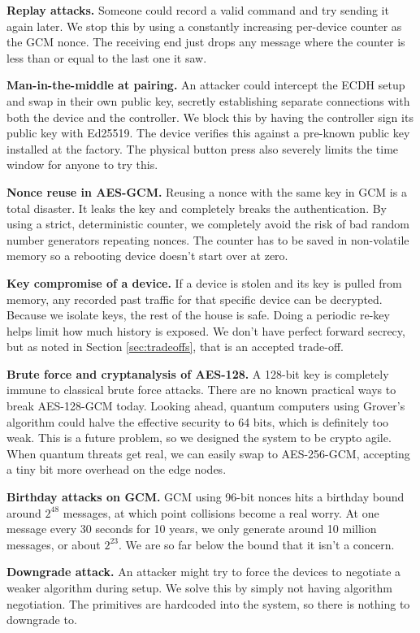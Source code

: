 \documentclass[a4paper,11pt]{article}
\begin{document}
\textbf{Replay attacks.} Someone could record a valid command and try sending it again later. We stop this by using a constantly increasing per-device counter as the GCM nonce. The receiving end just drops any message where the counter is less than or equal to the last one it saw.

\textbf{Man-in-the-middle at pairing.} An attacker could intercept the ECDH setup and swap in their own public key, secretly establishing separate connections with both the device and the controller. We block this by having the controller sign its public key with Ed25519. The device verifies this against a pre-known public key installed at the factory. The physical button press also severely limits the time window for anyone to try this.

\textbf{Nonce reuse in AES-GCM.} Reusing a nonce with the same key in GCM is a total disaster. It leaks the key and completely breaks the authentication. By using a strict, deterministic counter, we completely avoid the risk of bad random number generators repeating nonces. The counter has to be saved in non-volatile memory so a rebooting device doesn't start over at zero.

\textbf{Key compromise of a device.} If a device is stolen and its key is pulled from memory, any recorded past traffic for that specific device can be decrypted. Because we isolate keys, the rest of the house is safe. Doing a periodic re-key helps limit how much history is exposed. We don't have perfect forward secrecy, but as noted in Section \ref{sec:tradeoffs}, that is an accepted trade-off.

\textbf{Brute force and cryptanalysis of AES-128.} A 128-bit key is completely immune to classical brute force attacks. There are no known practical ways to break AES-128-GCM today. Looking ahead, quantum computers using Grover's algorithm could halve the effective security to 64 bits, which is definitely too weak. This is a future problem, so we designed the system to be crypto agile. When quantum threats get real, we can easily swap to AES-256-GCM, accepting a tiny bit more overhead on the edge nodes.

\textbf{Birthday attacks on GCM.} GCM using 96-bit nonces hits a birthday bound around $2^{48}$ messages, at which point collisions become a real worry. At one message every 30 seconds for 10 years, we only generate around 10 million messages, or about $2^{23}$. We are so far below the bound that it isn't a concern.

\textbf{Downgrade attack.} An attacker might try to force the devices to negotiate a weaker algorithm during setup. We solve this by simply not having algorithm negotiation. The primitives are hardcoded into the system, so there is nothing to downgrade to.
\end{document}
